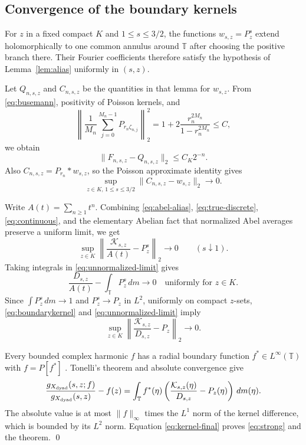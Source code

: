 \documentclass[11pt]{article}
\newcommand{\T}{\mathbb T}
\newcommand{\dm}{\,dm}
\begin{document}
\subsection{Convergence of the boundary kernels}

For $z$ in a fixed compact $K$ and $1\le s\le3/2$, the functions
$w_{s,z}=P_z^s$ extend holomorphically to one common annulus around $\T$
after choosing the positive branch there.  Their Fourier coefficients
therefore satisfy the hypothesis of Lemma~\ref{lem:alias} uniformly in
$(s,z)$.

Let $Q_{n,s,z}$ and $C_{n,s,z}$ be the quantities in that lemma for
$w_{s,z}$.  From \eqref{eq:busemann}, positivity of Poisson kernels, and
\[
 \left\|\frac1{M_n}\sum_{j=0}^{M_n-1}
 P_{r_n\zeta_{n,j}}\right\|_2^2
 =1+2\frac{r_n^{2M_n}}{1-r_n^{2M_n}}\le C,
\]
we obtain
\begin{equation}\label{eq:true-discrete}
 \|F_{n,s,z}-Q_{n,s,z}\|_2\le C_K2^{-n}.
\end{equation}
Also $C_{n,s,z}=P_{r_n}*w_{s,z}$, so the Poisson approximate identity gives
\begin{equation}\label{eq:continuous}
 \sup_{z\in K,\,1\le s\le3/2}
 \|C_{n,s,z}-w_{s,z}\|_2\longrightarrow0.
\end{equation}

Write $A(t)=\sum_{n\ge1}t^n$.  Combining
\eqref{eq:abel-alias}, \eqref{eq:true-discrete},
\eqref{eq:continuous}, and the elementary Abelian fact that normalized Abel
averages preserve a uniform limit, we get
\begin{equation}\label{eq:unnormalized-limit}
 \sup_{z\in K}
 \left\|\frac{\mathcal K_{s,z}}{A(t)}-P_z^s\right\|_2
 \longrightarrow0\qquad(s\downarrow1).
\end{equation}
Taking integrals in \eqref{eq:unnormalized-limit} gives
\[
 \frac{D_{s,z}}{A(t)}-\int_\T P_z^s\dm\longrightarrow0
 \quad\text{uniformly for }z\in K.
\]
Since $\int P_z^s\dm\to1$ and $P_z^s\to P_z$ in $L^2$, uniformly on
compact $z$-sets, \eqref{eq:boundarykernel} and
\eqref{eq:unnormalized-limit} imply
\begin{equation}\label{eq:kernel-final}
 \sup_{z\in K}\left\|\frac{\mathcal K_{s,z}}{D_{s,z}}-P_z\right\|_2
 \longrightarrow0.
\end{equation}

Every bounded complex harmonic $f$ has a radial boundary function
$f^*\in L^\infty(\T)$ with $f=P[f^*]$ \cite[Chapter I]{Duren}.  Tonelli's
theorem and absolute convergence give
\[
 \frac{g_{X_{\rm dyad}}(s,z;f)}{g_{X_{\rm dyad}}(s,z)}-f(z)
 =\int_\T f^*(\eta)
 \left(\frac{\mathcal K_{s,z}(\eta)}{D_{s,z}}-P_z(\eta)\right)\dm(\eta).
\]
The absolute value is at most $\|f\|_\infty$ times the $L^1$ norm of the
kernel difference, which is bounded by its $L^2$ norm.  Equation
\eqref{eq:kernel-final} proves \eqref{eq:strong} and the theorem.
\qed
\end{document}
